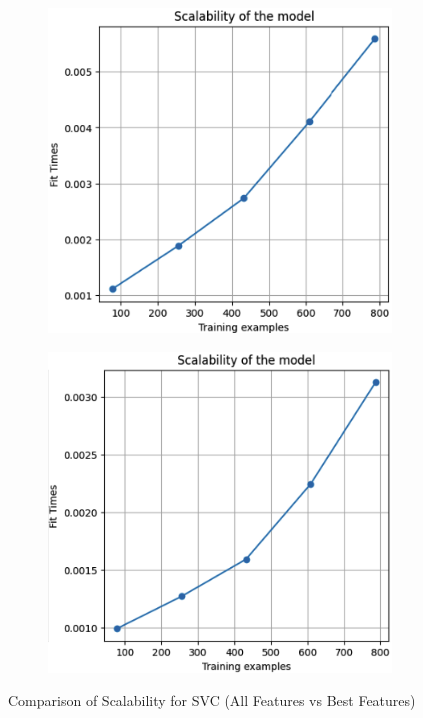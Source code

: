 \documentclass[conference]{IEEEtran}
\begin{document}
\begin{figure}[H]
    \centering
    \begin{subfigure}[b]{0.45\linewidth}
        \centering
        \includegraphics[width=\linewidth]{images/ScalabilitySVCAllFeatures.png}
        \label{fig:scalability-all}
    \end{subfigure}
    \hfill
    \begin{subfigure}[b]{0.45\linewidth}
        \centering
        \includegraphics[width=\linewidth]{images/ScalabilitySVCBestFeatures.png}
        \label{fig:scalability-best}
    \end{subfigure}
    \caption{Comparison of Scalability for SVC (All Features vs Best Features)}
    \label{fig:scalability-comparison}
\end{figure}
\end{document}
